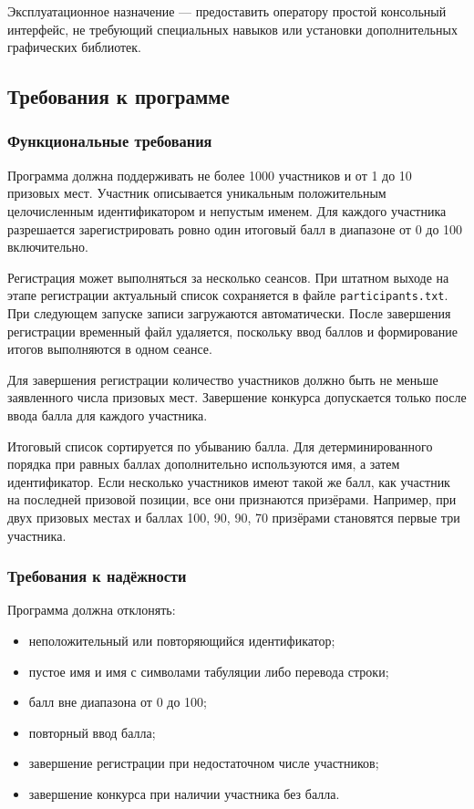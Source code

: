 \documentclass[14pt,a4paper]{extarticle}
\newcommand{\code}[1]{\texttt{#1}}
\begin{document}
Эксплуатационное назначение --- предоставить оператору простой консольный интерфейс, не требующий специальных навыков или установки дополнительных графических библиотек.

\subsection{Требования к программе}

\subsubsection{Функциональные требования}

Программа должна поддерживать не более 1000 участников и от 1 до 10 призовых мест. Участник описывается уникальным положительным целочисленным идентификатором и непустым именем. Для каждого участника разрешается зарегистрировать ровно один итоговый балл в диапазоне от 0 до 100 включительно.

Регистрация может выполняться за несколько сеансов. При штатном выходе на этапе регистрации актуальный список сохраняется в файле \code{participants.txt}. При следующем запуске записи загружаются автоматически. После завершения регистрации временный файл удаляется, поскольку ввод баллов и формирование итогов выполняются в одном сеансе.

Для завершения регистрации количество участников должно быть не меньше заявленного числа призовых мест. Завершение конкурса допускается только после ввода балла для каждого участника.

Итоговый список сортируется по убыванию балла. Для детерминированного порядка при равных баллах дополнительно используются имя, а затем идентификатор. Если несколько участников имеют такой же балл, как участник на последней призовой позиции, все они признаются призёрами. Например, при двух призовых местах и баллах 100, 90, 90, 70 призёрами становятся первые три участника.

\subsubsection{Требования к надёжности}

Программа должна отклонять:
\begin{itemize}
\item неположительный или повторяющийся идентификатор;
\item пустое имя и имя с символами табуляции либо перевода строки;
\item балл вне диапазона от 0 до 100;
\item повторный ввод балла;
\item завершение регистрации при недостаточном числе участников;
\item завершение конкурса при наличии участника без балла.
\end{itemize}
\end{document}
